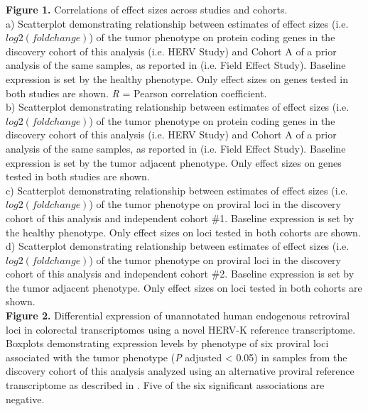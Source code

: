 \textbf{Figure 1.} Correlations of effect sizes across studies and cohorts. \\
a) Scatterplot demonstrating relationship between estimates of effect sizes (i.e. $log2(fold change)$) of the tumor phenotype on protein coding genes in the discovery cohort of this analysis (i.e. HERV Study) and Cohort A of a prior analysis of the same samples, as reported in \citep{Dampier2020} (i.e. Field Effect Study).
Baseline expression is set by the healthy phenotype.
Only effect sizes on genes tested in both studies are shown.
\emph{R} = Pearson correlation coefficient. \\
b) Scatterplot demonstrating relationship between estimates of effect sizes (i.e. $log2(fold change)$) of the tumor phenotype on protein coding genes in the discovery cohort of this analysis (i.e. HERV Study) and Cohort A of a prior analysis of the same samples, as reported in \citep{Dampier2020} (i.e. Field Effect Study).
Baseline expression is set by the tumor adjacent phenotype.
Only effect sizes on genes tested in both studies are shown. \\
c) Scatterplot demonstrating relationship between estimates of effect sizes (i.e. $log2(fold change)$) of the tumor phenotype on proviral loci in the discovery cohort of this analysis and independent cohort \#1.
Baseline expression is set by the healthy phenotype.
Only effect sizes on loci tested in both cohorts are shown. \\
d) Scatterplot demonstrating relationship between estimates of effect sizes (i.e. $log2(fold change)$) of the tumor phenotype on proviral loci in the discovery cohort of this analysis and independent cohort \#2.
Baseline expression is set by the tumor adjacent phenotype.
Only effect sizes on loci tested in both cohorts are shown.\\

\textbf{Figure 2.} Differential expression of unannotated human endogenous retroviral loci in colorectal transcriptomes using a novel HERV-K reference transcriptome. \\
Boxplots demonstrating expression levels by phenotype of six proviral loci associated with the tumor phenotype (\emph{P} adjusted < 0.05) in samples from the discovery cohort of this analysis analyzed using an alternative proviral reference transcriptome as described in \citep{Grabski2020}.
Five of the six significant associations are negative.
